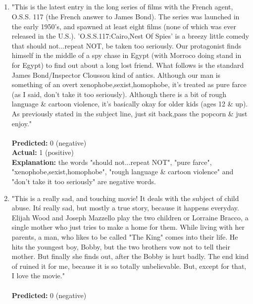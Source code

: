 \documentclass{article}
\begin{document}
\subsection{} %
\begin{enumerate}
    \item "This is the latest entry in the long series of films with the French agent,
    O.S.S. 117 (the French answer to James Bond). The series was launched in the early 1950's,
    and spawned at least eight films (none of which was ever released in the U.S.).
    'O.S.S.117:Cairo,Nest Of Spies' is a breezy little comedy that should not...repeat NOT,
    be taken too seriously.
    Our protagonist finds himself in the middle of a spy chase in Egypt (with Morroco
    doing stand in for Egypt) to find out about a long lost friend. What follows is the
    standard James Bond/Inspector Cloussou kind of antics. Although our man is something of
    an overt xenophobe,sexist,homophobe, it's treated as pure farce (as I said,
    don't take it too seriously). Although there is a bit of rough language \& cartoon violence,
    it's basically okay for older kids (ages 12 \& up). As previously stated in the subject
    line, just sit back,pass the popcorn \& just enjoy."\\\\
    \textbf{Predicted:} 0 (negative)\\
    \textbf{Actual:} 1 (positive)\\
    \textbf{Explanation:} the words "should not...repeat NOT", "pure farce", "xenophobe,sexist,homophobe", "rough language \& cartoon violence" and "don't take it too seriously" are negative words.\\
    \item "This is a really sad, and touching movie! It deals with the subject of child abuse.
    It\'s really sad, but mostly a true story, because it happens everyday.
    Elijah Wood and Joseph Mazzello play the two children or Lorraine Bracco, a single mother who just tries to
    make a home for them. While living with her parents, a man, who likes to be called "The King"
    comes into their life. He hits the youngest boy, Bobby, but the two brothers vow not to tell
    their mother. But finally she finds out, after the Bobby is hurt badly. The end kind of ruined
    it for me, because it is so totally unbelievable. But, except for that, I love the movie."\\\\
    \textbf{Predicted:} 0 (negative)\\

\end{enumerate}
\end{document}
